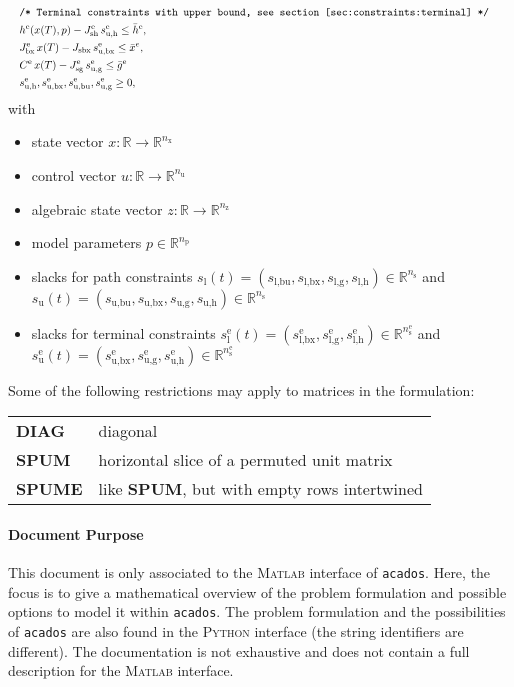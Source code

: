 \documentclass[english]{article}
\newcommand{\acados}{\texttt{acados}}
\newcommand{\matlab}{\textsc{Matlab}}
\newcommand{\python}{\textsc{Python}}
\newcommand{\ind}[1]{_{\textrm{#1}}}
\newcommand{\terminal}{^{\textrm{e}}}
\newcommand{\Lower}{\ind{l}}
\newcommand{\lowerh}{\ind{l,h}}
\newcommand{\lowerbx}{\ind{l,bx}}
\newcommand{\lowerbu}{\ind{l,bu}}
\newcommand{\lowerg}{\ind{l,g}}
\newcommand{\upper}{\ind{u}}
\newcommand{\upperh}{\ind{u,h}}
\newcommand{\upperbx}{\ind{u,bx}}
\newcommand{\upperbu}{\ind{u,bu}}
\newcommand{\upperg}{\ind{u,g}}
\newcommand{\mathComment}[1]{\texttt{/* #1 */}}
\newcommand{\R}{\mathbb{R}}
\newcommand{\nx}{n\ind{x}}
\newcommand{\nuu}{n\ind{u}}
\newcommand{\nz}{n\ind{z}}
\newcommand{\np}{n\ind{p}}
\newcommand{\ns}{n\ind{s}}
\begin{document}
\begin{align}
    &&&\mathComment{Terminal constraints with upper bound, see section \ref{sec:constraints:terminal}}\nonumber\\
    &&& h\terminal(x(T), p) - J\ind{sh}\terminal\, s\ind{u,h}\terminal \leq \bar{h}\terminal, &&\label{eq:constraints:terminal:upper_bounds:start}\\
    &&& J_{\textrm{bx}}\terminal\, x(T) - J\ind{sbx}\, s\ind{u,bx}\terminal \leq \bar{x}^{e}, &&\\ %
    &&& C\terminal\, x(T) - J\ind{sg}\terminal\, s\ind{u,g}\terminal \leq \bar{g}\terminal \\
    &&& s\upperh\terminal, s\upperbx\terminal, s\upperbu\terminal, s\upperg\terminal \geq 0,\label{eq:constraints:terminal:upper_bounds:end}
\end{align}
%
with
\begin{itemize}
\item state vector $ x: \R \rightarrow \R^{\nx} $
\item control vector $ u: \R \rightarrow \R^{\nuu} $
\item algebraic state vector $ z: \R \rightarrow \R^{\nz} $
\item model parameters $ p \in \R^{\np} $
\item slacks for path constraints $ s\Lower(t) = (s\lowerbu, s\lowerbx, s\lowerg, s\lowerh) \in \R^{\ns} $ and $ s\upper(t) = (s\upperbu, s\upperbx, s\upperg, s\upperh) \in \R^{\ns} $
\item slacks for terminal constraints $ s\Lower\terminal(t) = (s\lowerbx\terminal, s\lowerg\terminal, s\lowerh\terminal) \in \R^{\ns\terminal} $ and $ s\upper\terminal(t) = (s\upperbx\terminal, s\upperg\terminal, s\upperh\terminal) \in \R^{\ns\terminal} $
\end{itemize}
%
Some of the following restrictions may apply to matrices in the formulation:
\begin{center}
    \begin{tabular}{ll}
        \textbf{DIAG} & diagonal\\
        \textbf{SPUM} & horizontal slice of a permuted unit matrix\\
        \textbf{SPUME} & like \textbf{SPUM}, but with empty rows intertwined
    \end{tabular}
\end{center}
%
\paragraph{Document Purpose}
This document is only associated to the \matlab{} interface of \acados.
Here, the focus is to give a mathematical overview of the problem formulation and possible options to model it within \acados.
The problem formulation and the possibilities of \acados{} are also found in the \python{} interface (the string identifiers are different).
The documentation is not exhaustive and does not contain a full description for the \matlab{} interface.
\end{document}
